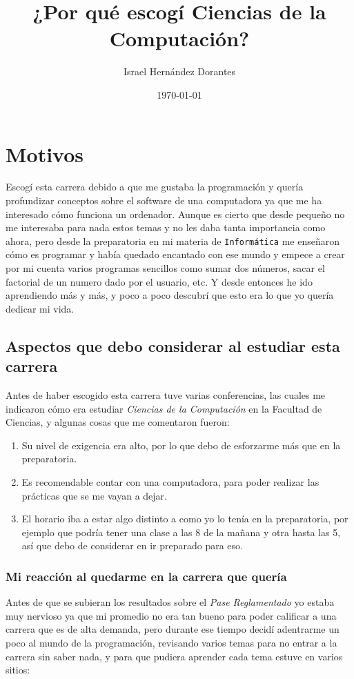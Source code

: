 \documentclass[12pt, letterpaper]{article}
\title{\textbf{¿Por qué escogí Ciencias de la Computación?}}
\author{Israel Hernández Dorantes}
\date{\today}
\begin{document}
\maketitle

\section{Motivos}
Escogí esta carrera debido a que me gustaba la programación y quería profundizar conceptos sobre el software de una computadora ya que me ha interesado cómo funciona un ordenador. Aunque es cierto que desde pequeño no me interesaba para nada estos temas y no les daba tanta importancia como ahora, pero desde la preparatoria en mi materia de \texttt{Informática} me enseñaron cómo es programar y había quedado encantado con ese mundo y empece a crear por mi cuenta varios programas sencillos como sumar dos números, sacar el factorial de un numero dado por el usuario, etc. Y desde entonces he ido aprendiendo más y más, y poco a poco descubrí que esto era lo que yo quería dedicar mi vida.

\subsection{Aspectos que debo considerar al estudiar esta carrera}
Antes de haber escogido esta carrera tuve varias conferencias, las cuales me indicaron cómo era estudiar \textit{Ciencias de la Computación} en la Facultad de Ciencias, y algunas cosas que me comentaron fueron:
\begin{enumerate}
  \item{Su nivel de exigencia era alto, por lo que debo de esforzarme más que en la preparatoria.}
  \item{Es recomendable contar con una computadora, para poder realizar las prácticas que se me vayan a dejar.}
  \item{El horario iba a estar algo distinto a como yo lo tenía en la preparatoria, por ejemplo que podría tener una clase a las 8 de la mañana y otra hasta las 5, así         que debo de considerar en ir preparado para eso.}
\end{enumerate}
\subsubsection{Mi reacción al quedarme en la carrera que quería}
Antes de que se subieran los resultados sobre el \textit{Pase Reglamentado} yo estaba muy nervioso ya que mi promedio no era tan bueno para poder calificar a una carrera que es de alta demanda, pero durante ese tiempo decidí adentrarme un poco al mundo de la programación, revisando varios temas para no entrar a la carrera sin saber nada, y para que pudiera aprender cada tema estuve en varios sitios:
\end{document}
